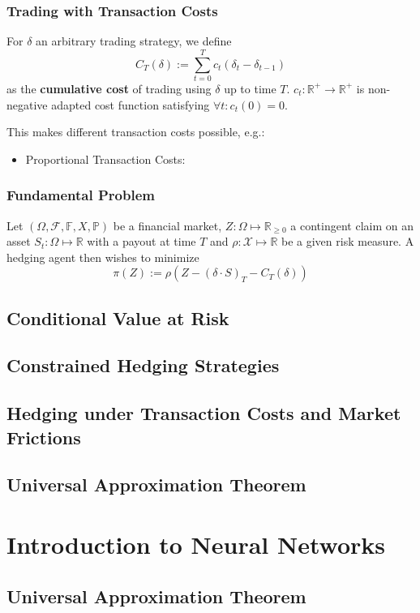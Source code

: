 \documentclass[serif]{beamer}
\def\R{{\mathbb R}}
\def\P{{\mathbb P}}
\def\O{{\Omega}}
\def\cF{{\mathcal F}}
\def\cX{{\mathcal X}}
\def\F{{\mathbb F}}
\def\vs{{\vspace{0.5cm}}}
\def\fm{{(\O, \cF, \F, X, \P)}}
\begin{document}
\begin{frame}[t]
    \frametitle{Trading with Transaction Costs}
    For $\delta$ an arbitrary trading strategy, we define
    $$C_T (\delta) := \sum_{t=0}^T c_t (\delta_t - \delta_{t-1})$$
    as the \textbf{cumulative cost} of
    trading using $\delta$ up to time $T$.
    $c_t : \R^+ \to \R^+$ is non-negative adapted cost function satisfying $\forall t: c_t (0) = 0$.
    \vs

    This makes different transaction costs possible, e.g.:
    \begin{itemize}
        \item Proportional Transaction Costs:
    \end{itemize}
\end{frame}

\begin{frame}
    \frametitle{Fundamental Problem}
    Let $\fm$ be a financial market, $Z: \O \mapsto \R_{\geq 0}$ a contingent claim on an asset
    $S_t: \O \mapsto \R$ with a payout at time $T$ and
    $\rho: \cX \mapsto \R$ be a given risk measure.
    A hedging agent then wishes to minimize
    \[
        \pi (Z) := \rho (
        Z - (\delta \cdot S)_T - C_T (\delta)
        )
    \]
\end{frame}

\subsection{Conditional Value at Risk}

\subsection{Constrained Hedging Strategies}
\subsection{Hedging under Transaction Costs and Market Frictions}
\subsection{Universal Approximation Theorem}

\section{Introduction to Neural Networks}
\subsection{Universal Approximation Theorem}
\end{document}
